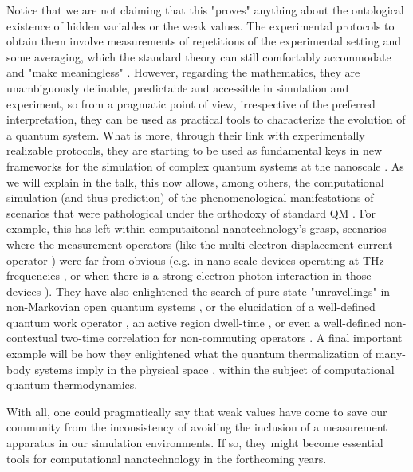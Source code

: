 \documentclass[11pt, a4paper]{article} %
\begin{document}
Notice that we are not claiming that this "proves" anything about the ontological existence of hidden variables or the weak values. The experimental protocols to obtain them involve measurements of repetitions of the experimental setting and some averaging, which the standard theory can still comfortably accommodate and "make meaningless" \cite{hownot}. However, regarding the mathematics, they are unambiguously definable, predictable and accessible in simulation and experiment, so from a pragmatic point of view, irrespective of the preferred interpretation, they can be used as practical tools to characterize the evolution of a quantum system. What is more, through their link with experimentally realizable protocols, they are starting to be used as fundamental keys in new frameworks for the simulation of complex quantum systems at the nanoscale \cite{DevInPosition2, NMisModal}. As we will explain in the talk, this now allows, among others, the computational simulation (and thus prediction) of the phenomenological manifestations of scenarios that were pathological under the orthodoxy of standard QM \cite{work1, work2,interpretSSE,NMisModal, equiv, Pel, Thz, resonant, thermalization}. For example, this has left within computaitonal nanotechnology's grasp, scenarios where the measurement operators (like the multi-electron displacement current operator \cite{equiv, Pel}) were far from obvious (e.g. in nano-scale devices operating at THz frequencies \cite{Thz}, or when there is a strong electron-photon interaction in those devices \cite{resonant}). They have also enlightened the search of pure-state "unravellings" in non-Markovian open quantum systems \cite{NMisModal, interpretSSE}, or the elucidation of a well-defined quantum work operator \cite{work1,work2}, an active region dwell-time \cite{tunnel1, tunnel2,modern, DevInPosition2}, or even a well-defined non-contextual two-time correlation for non-commuting operators \cite{DevInPosition2}. A final important example will be how they enlightened what the quantum thermalization of many-body systems imply in the physical space \cite{thermalization}, within the subject of computational quantum thermodynamics.

With all, one could pragmatically say that weak values have come to save our community from the inconsistency of avoiding the inclusion of a measurement apparatus in our simulation environments. If so, they might become essential tools for computational nanotechnology in the forthcoming years.
\vspace{0.4cm}

\begin{multicols}{2}
{\printbibliography
}
\end{multicols}
\end{document}
